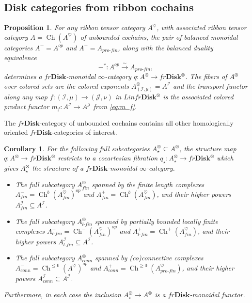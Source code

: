 \documentclass[reqno]{amsart}
\newtheorem{proposition}[lemma]{Proposition}
\newtheorem{corollary}[lemma]{Corollary}
\theoremstyle{definition}
\newcommand{\mcl}[1]{\mathcal{#1}}
\newcommand{\opn}[1]{\operatorname{#1}}
\newcommand{\ot}{\otimes}
\newcommand{\Disk}{\mathbf{Disk}}
\newcommand{\pf}{pro\text{-}fin}
\renewcommand{\1}{\mathbf{1}}
\begin{document}
\subsection{Disk categories from ribbon cochains}
\label{sect:fr_cochains}

\begin{proposition}\label{prop:fr_cochains}
For any ribbon tensor category $A^{\heartsuit}$, with associated ribbon tensor category $A=\opn{Ch}(A^{\heartsuit})$ of unbounded cochains, the pair of balanced monoidal categories $A^-=A^{op}$ and $A^+=A_{\pf}$, along with the balanced duality equivalence
\[
-^{\ast}:A^{op}\overset{\sim}\to A_{\pf},
\]
determines a $fr\Disk$-monoidal $\infty$-category $q:A^{\ot}\to fr\Disk^{\ot}$.  The fibers of $A^{\ot}$ over colored sets are the colored exponents $A^{\ot}_{(\mcl{I},\mu)}=A^{\mcl{I}}$ and the transport functor along any map $f:(\mcl{I},\mu)\to (\mcl{J},\nu)$ in $Linfr\Disk^{\ot}$ is the associated colored product functor $m_f:A^{\mcl{I}}\to A^{\mcl{J}}$ from \eqref{eq:m_f}.
\end{proposition}

The $fr\Disk$-category of unbounded cochains contains all other homologically oriented $fr\Disk$-categories of interest.

\begin{corollary}\label{cor:1714}
For the following full subcategories $A^{\ot}_{\star}\subseteq A^{\ot}$, the structure map $q:A^{\ot}\to fr\Disk^{\ot}$ restricts to a cocartesian fibration $q_{\star}:A^{\ot}_{\star}\to fr\Disk^{\ot}$ which gives $A^{\ot}_{\star}$ the structure of a $fr\Disk$-monoidal $\infty$-category.
\begin{itemize}
\item The full subcategory $A^{\ot}_{fin}$ spanned by the finite length complexes $A^-_{fin}=\opn{Ch}^b(A^{\heartsuit}_{fin})^{op}$ and $A^+_{fin}=\opn{Ch}^b(A^{\heartsuit}_{fin})$, and their higher powers $A^{\mcl{I}}_{fin}\subseteq A^{\mcl{I}}$.\vspace{1mm}
\item The full subcategory $A^{\ot}_{l\text{-}fin}$ spanned by partially bounded locally finite complexes $A^-_{l\text{-}fin}=\opn{Ch}^-(A^{\heartsuit}_{fin})^{op}$ and $A^+_{l\text{-}fin}=\opn{Ch}^+(A^{\heartsuit}_{fin})$, and their higher powers $A^{\mcl{I}}_{l\text{-}fin}\subseteq A^{\mcl{I}}$.\vspace{1mm}
\item The full subcategory $A^{\ot}_{conn}$ spanned by (co)connective complexes $A^-_{conn}=\opn{Ch}^{\leq 0}(A^{\heartsuit})^{op}$ and $A^+_{conn}=\opn{Ch}^{\geq 0}(A^{\heartsuit}_{\pf})$, and their higher powers $A^{\mcl{I}}_{conn}\subseteq A^{\mcl{I}}$.
\end{itemize}
Furthermore, in each case the inclusion $A^{\ot}_{\star}\to A^{\ot}$ is a $fr\Disk$-monoidal functor.
\end{corollary}
\end{document}
